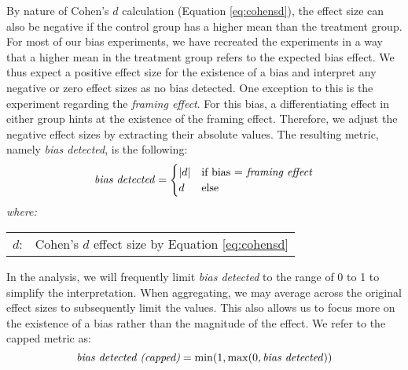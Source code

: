 \par By nature of Cohen's $d$ calculation (Equation \ref{eq:cohensd}), the effect size can also be negative if the control group has a higher mean than the treatment group. For most of our bias experiments, we have recreated the experiments in a way that a higher mean in the treatment group refers to the expected bias effect. We thus expect a positive effect size for the existence of a bias and interpret any negative or zero effect sizes as no bias detected. One exception to this is the experiment regarding the \textit{framing effect}. For this bias, a differentiating effect in either group hints at the existence of the framing effect. Therefore, we adjust the negative effect sizes by extracting their absolute values. The resulting metric, namely \textit{bias detected}, is the following:
\begin{equation} \label{eq:bias_detected}
    \text{\textit{bias detected}} =
    \begin{cases}
        |d| & \text{if bias = \textit{framing effect}} \\
        d & \text{else}
    \end{cases}
\end{equation}
\hspace{0.5cm} \textit{where:} \\
\hspace*{3em}
\begin{tabular}{rl}
    $d$:& Cohen's $d$ effect size by Equation \ref{eq:cohensd} \\
\end{tabular}

\par In the analysis, we will frequently limit \textit{bias detected} to the range of 0 to 1 to simplify the interpretation. When aggregating, we may average across the original effect sizes to subsequently limit the values. This also allows us to focus more on the existence of a bias rather than the magnitude of the effect. We refer to the capped metric as:
\begin{equation} \label{eq:bias_detected_capped}
    \text{\textit{bias detected (capped)}} = \min(1, \max(0, \text{\textit{bias detected}}))
\end{equation}

